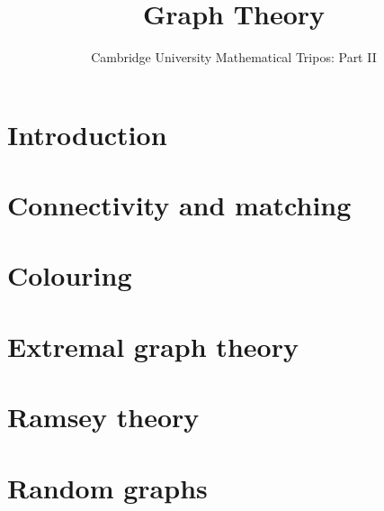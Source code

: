 \documentclass{article}
\title{Graph Theory}
\author{Cambridge University Mathematical Tripos: Part II}
\begin{document}
\maketitle

\tableofcontentsnewpage{}

\section{Introduction}

\section{Connectivity and matching}

\section{Colouring}

\section{Extremal graph theory}

\section{Ramsey theory}

\section{Random graphs}

\end{document}
